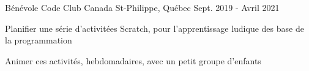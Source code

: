 

\begin{cventries}

  \cventry
    {Bénévole} %
    {Code Club Canada} %
    {St-Philippe, Québec} %
    {Sept. 2019 - Avril 2021} %
    {
      \begin{cvitems} %
        \item {Planifier une série d'activitées Scratch, pour l'apprentissage ludique des base de la programmation}
        \item {Animer ces activités, hebdomadaires, avec un petit groupe d'enfants}
      \end{cvitems}
    }

\end{cventries}
